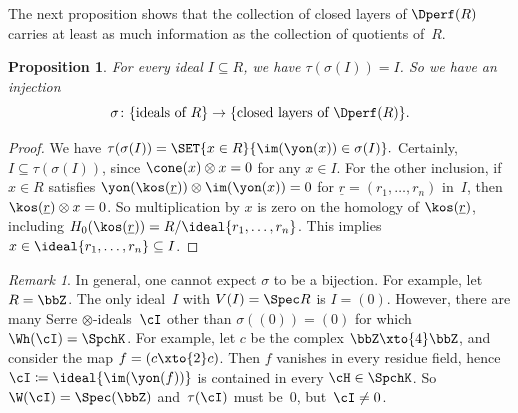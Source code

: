 \documentclass[11pt]{amsart}
\numberwithin{equation}{section} %
\theoremstyle{plain}
\newtheorem{prop}[equation]{Proposition}
\theoremstyle{definition}
\theoremstyle{remark}
\newtheorem{rem}[equation]{Remark}
\begin{document}
The next proposition shows that the collection of closed layers of $\Dperf(R)$ carries at least as much information as the collection of quotients of~$R$.
%
\begin{prop}
\label{prop:tau-retraction-of-sigma}%
For every ideal $I \subseteq R$, we have $\tau(\sigma(I)) = I$. So we have an injection \[\sigma \colon \{\textrm{ideals of } R\} \to \{\textrm{closed layers of } \Dperf(R)\}.\]
\end{prop}
\begin{proof}
We have $\tau(\sigma(I)) = \SET{x \in R}{\im(\yon(x)) \in \sigma(I)}.$ Certainly, $I \subseteq \tau(\sigma(I))$, since $\cone(x) \otimes x = 0$ for any $x \in I$. For the other inclusion, if~$x \in R$ satisfies $\yon(\kos(\underline{r})) \otimes \im(\yon(x)) = 0$ for $\underline{r}=(r_1, \ldots, r_n)$ in~$I$, then $\kos(\underline{r}) \otimes x = 0$. So multiplication by $x$ is zero on the homology of $\kos(\underline{r})$, including $H_0(\kos(\underline{r})) = R / \ideal{r_1,\ldots,r_n}$. This implies $x \in \ideal{r_1,\ldots,r_n} \subseteq I$.
\end{proof}

%
\begin{rem}
In general, one cannot expect $\sigma$ to be a bijection. For example, let $R = \bbZ$. The only ideal~$I$ with $V(I) = \Spec R$ is $I=(0)$. However, there are many Serre $\otimes$-ideals~$\cI$ other than $\sigma((0)) = (0)$ for which $\Wh(\cI) = \SpchK$. For example, let $c$ be the complex $\bbZ \xto{4} \bbZ$, and consider the map $f = (c \xto{2} c)$. Then $f$ vanishes in every residue field, hence $\cI \coloneq \ideal{\im(\yon(f))}$ is contained in every $\cH \in \SpchK$. So~$\W(\cI)=\Spec(\bbZ)$ and~$\tau(\cI)$ must be~$0$, but~$\cI\neq 0$.
\end{rem}
\end{document}
